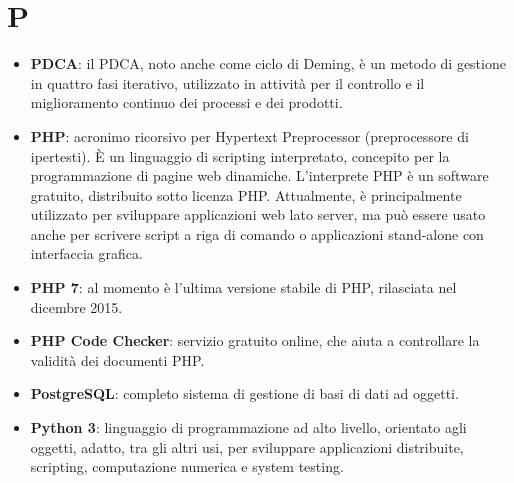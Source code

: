 \section{P}
\begin{itemize} 
	\item \textbf{PDCA}: il PDCA, noto anche come ciclo di Deming, è un metodo di gestione in quattro fasi iterativo, utilizzato in attività per il controllo e il miglioramento continuo dei processi e dei prodotti. 
	\item \textbf{PHP}: acronimo ricorsivo per Hypertext Preprocessor (preprocessore di ipertesti). \MakeUppercase{è} un linguaggio di scripting interpretato, concepito per la programmazione di pagine web dinamiche. L'interprete PHP è un software gratuito, distribuito sotto licenza PHP. Attualmente, è principalmente utilizzato per sviluppare applicazioni web lato server, ma può essere usato anche per scrivere script a riga di comando o applicazioni stand-alone con interfaccia grafica.
	\item \textbf{PHP 7}: al momento è l'ultima versione stabile di PHP, rilasciata nel dicembre 2015.
	\item \textbf{PHP Code Checker}: servizio gratuito online, che aiuta a controllare la validità dei documenti PHP.
	\item \textbf{PostgreSQL}: completo sistema di gestione di basi di dati ad oggetti.
	\item \textbf{Python 3}: linguaggio di programmazione ad alto livello, orientato agli oggetti, adatto, tra gli altri usi, per sviluppare applicazioni distribuite, scripting, computazione numerica e system testing.
\end{itemize}

